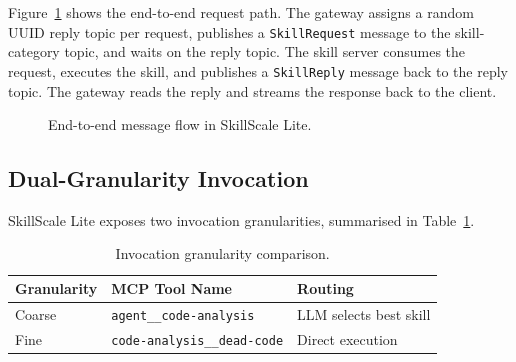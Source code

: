 \documentclass[sigconf,nonacm]{acmart}
\begin{document}
Figure~\ref{fig:flow} shows the end-to-end request path. The gateway assigns a random UUID reply topic per request, publishes a \texttt{SkillRequest} message to the skill-category topic, and waits on the reply topic. The skill server consumes the request, executes the skill, and publishes a \texttt{SkillReply} message back to the reply topic. The gateway reads the reply and streams the response back to the client.

\begin{figure}[h]
\centering
{}
\caption{End-to-end message flow in SkillScale Lite.}
\label{fig:flow}
\end{figure}

\subsection{Dual-Granularity Invocation}

SkillScale Lite exposes two invocation granularities, summarised in Table~\ref{tab:granularity}.

\begin{table}[h]
\centering
\caption{Invocation granularity comparison.}
\label{tab:granularity}
\begin{tabular}{lll}
\toprule
\textbf{Granularity} & \textbf{MCP Tool Name} & \textbf{Routing} \\
\midrule
Coarse & \texttt{agent\_\_code-analysis} & LLM selects best skill \\
Fine   & \texttt{code-analysis\_\_dead-code} & Direct execution \\
\bottomrule
\end{tabular}
\end{table}
\end{document}
